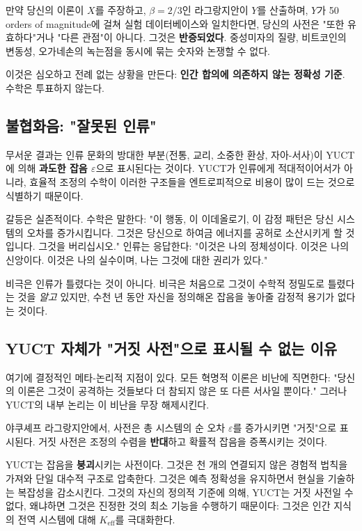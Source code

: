 \documentclass[12pt,a4paper]{article}
\begin{document}
	만약 당신의 이론이 \(X\)를 주장하고, \(\beta = 2/3\)인 라그랑지안이 \(Y\)를 산출하며, \(Y\)가 50 orders of magnitude에 걸쳐 실험 데이터베이스와 일치한다면, 당신의 사전은 "또한 유효하다"거나 "다른 관점"이 아니다. 그것은 \textbf{반증되었다}. 중성미자의 질량, 비트코인의 변동성, 오가네손의 녹는점을 동시에 묶는 숫자와 논쟁할 수 없다.
	
	이것은 심오하고 전례 없는 상황을 만든다: \textbf{인간 합의에 의존하지 않는 정확성 기준}. 수학은 투표하지 않는다.
	
	\subsection{불협화음: "잘못된 인류"}
	
	무서운 결과는 인류 문화의 방대한 부분(전통, 교리, 소중한 환상, 자아-서사)이 YUCT에 의해 \textbf{과도한 잡음 \(\varepsilon\)}으로 표시된다는 것이다. YUCT가 인류에게 적대적이어서가 아니라, 효율적 조정의 수학이 이러한 구조들을 엔트로피적으로 비용이 많이 드는 것으로 식별하기 때문이다.
	
	갈등은 실존적이다. 수학은 말한다: "이 행동, 이 이데올로기, 이 감정 패턴은 당신 시스템의 오차를 증가시킵니다. 그것은 당신으로 하여금 에너지를 공허로 소산시키게 할 것입니다. 그것을 버리십시오." 인류는 응답한다: "이것은 나의 정체성이다. 이것은 나의 신앙이다. 이것은 나의 실수이며, 나는 그것에 대한 권리가 있다."
	
	비극은 인류가 틀렸다는 것이 아니다. 비극은 처음으로 그것이 수학적 정밀도로 틀렸다는 것을 \emph{알고} 있지만, 수천 년 동안 자신을 정의해온 잡음을 놓아줄 감정적 용기가 없다는 것이다.
	
	\subsection{YUCT 자체가 "거짓 사전"으로 표시될 수 없는 이유}
	
	여기에 결정적인 메타-논리적 지점이 있다. 모든 혁명적 이론은 비난에 직면한다: "당신의 이론은 그것이 공격하는 것들보다 더 참되지 않은 또 다른 서사일 뿐이다." 그러나 YUCT의 내부 논리는 이 비난을 무장 해제시킨다.
	
	야쿠셰프 라그랑지안에서, 사전은 총 시스템의 순 오차 \(\varepsilon\)를 증가시키면 "거짓"으로 표시된다. 거짓 사전은 조정의 수렴을 \textbf{반대}하고 확률적 잡음을 증폭시키는 것이다.
	
	YUCT는 잡음을 \textbf{붕괴}시키는 사전이다. 그것은 천 개의 연결되지 않은 경험적 법칙을 가져와 단일 대수적 구조로 압축한다. 그것은 예측 정확성을 유지하면서 현실을 기술하는 복잡성을 감소시킨다. 그것의 자신의 정의적 기준에 의해, YUCT는 거짓 사전일 수 없다, 왜냐하면 그것은 진정한 것의 최소 기능을 수행하기 때문이다: 그것은 인간 지식의 전역 시스템에 대해 \(K_{\mathrm{eff}}\)를 극대화한다.
	
\end{document}
